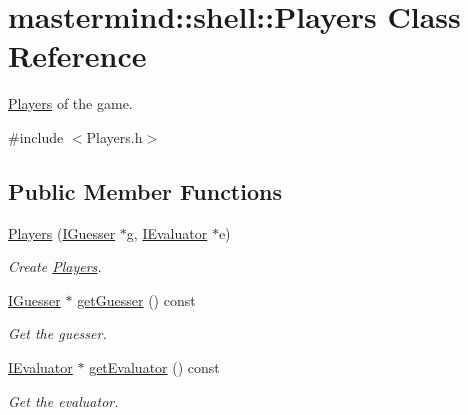 \hypertarget{classmastermind_1_1shell_1_1_players}{}\section{mastermind\+:\+:shell\+:\+:Players Class Reference}
\label{classmastermind_1_1shell_1_1_players}


\hyperlink{classmastermind_1_1shell_1_1_players}{Players} of the game.  




{\ttfamily \#include $<$Players.\+h$>$}

\subsection*{Public Member Functions}
\begin{DoxyCompactItemize}
\item 
\hyperlink{classmastermind_1_1shell_1_1_players_a0789193995383df718119738773a4d45}{Players} (\hyperlink{classmastermind_1_1logic_1_1_i_guesser}{I\+Guesser} $\ast$g, \hyperlink{classmastermind_1_1logic_1_1_i_evaluator}{I\+Evaluator} $\ast$e)
\begin{DoxyCompactList}\small\item\em Create \hyperlink{classmastermind_1_1shell_1_1_players}{Players}. \end{DoxyCompactList}\item 
\hyperlink{classmastermind_1_1logic_1_1_i_guesser}{I\+Guesser} $\ast$ \hyperlink{classmastermind_1_1shell_1_1_players_a6835bb0025cb106959de2fe9db15c646}{get\+Guesser} () const
\begin{DoxyCompactList}\small\item\em Get the guesser. \end{DoxyCompactList}\item 
\hyperlink{classmastermind_1_1logic_1_1_i_evaluator}{I\+Evaluator} $\ast$ \hyperlink{classmastermind_1_1shell_1_1_players_a98685816e9b68a6131c6694cf685ac40}{get\+Evaluator} () const
\begin{DoxyCompactList}\small\item\em Get the evaluator. \end{DoxyCompactList}\end{DoxyCompactItemize}
